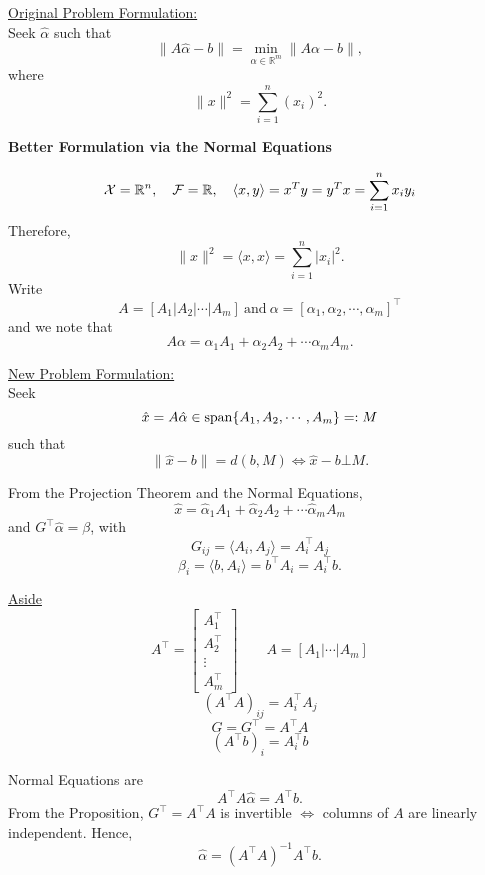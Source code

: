 \documentclass[letterpaper]{article}
\begin{document}
\underline{Original Problem Formulation:}\\

Seek $\hat{\alpha} $ such that $$\| A \hat{\alpha}-b \|=\min_{\alpha \in \mathbb{R}^m} \| A \alpha -b \|,$$
where $$\|x\|^2 =\sum\limits_{i=1}^n (x_i)^2. $$

\vspace*{.5cm}

\centerline{\bf Better Formulation via the Normal Equations}
\vspace*{-0.8cm}
$${\cal X}=\mathbb{R}^n, \quad {\cal F}=\mathbb{R}, \quad  \langle x,y \rangle = x^T y= y^T x= \sum\limits_{i=1}^n x_i y_i$$
Therefore,  $$\|x\|^2= \langle x,x \rangle =\sum\limits_{i=1}^n |x_i|^2.$$
Write $$A=[A_1 | A_2 | \cdots | A_m] ~\text{and}~\alpha = [\alpha_1, \alpha_2,  \cdots, \alpha_m]^\top$$
and we note that
$$ A \alpha = \alpha_1 A_1 + \alpha_2 A_2 + \cdots \alpha_m A_m.$$

\underline{New Problem Formulation:}\\
Seek $$\hat{x} = A \hat{\alpha} \in {\rm span}\{ A_1,A_2, \cdots, A_m \} =: M$$
such that $$ \|\hat{x}-b\|=d(b,M) \Leftrightarrow \hat{x}-b \bot M.$$

\newpage

From the Projection Theorem and the Normal Equations,
$$\hat{x}=\hat{\alpha}_1 A_1 +\hat{\alpha}_2 A_2 + \cdots \hat{\alpha}_m A_m $$
and $G^\top \hat{\alpha}=\beta$, with
$$G_{ij}= \langle A_i,A_j \rangle =A_i ^\top A_j$$ $$\beta_i =  \langle b,A_i \rangle  = b^\top A_i = A_i^\top b.$$



\underline{Aside}
$$A^\top=\begin{bmatrix} A_1^\top \\ A_2^\top \\ \vdots \\ A_m^\top  \end{bmatrix} \qquad A=[A_1| \cdots | A_m ]$$ $$(A^\top A)_{ij}=A^\top_i A_j$$
$$G=G^\top=A^\top A$$ $$(A^\top b)_i=A_i^\top b$$

Normal Equations are $$A^\top A \hat{\alpha} =A^\top b.$$
From the Proposition, $G^\top =A^\top A $ is invertible $ \Leftrightarrow $  columns of $A$ are linearly independent. Hence, $$\hat{\alpha}=(A^\top A)^{-1} A^\top b.$$
\end{document}
